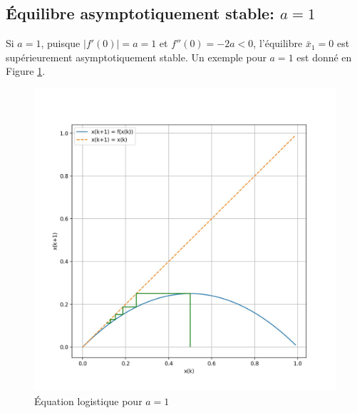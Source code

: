         \subsection{Équilibre asymptotiquement stable: $a = 1$}
            Si $a = 1$, puisque $|f'(0)| = a = 1$ et $f''(0) = -2a < 0$, l'équilibre $\bar{x}_1 = 0$ est supérieurement asymptotiquement stable. Un exemple pour $a=1$ est donné en Figure \ref{fig:logistique_differences_2}.
            \begin{figure}[ht!]
                \centering
                \includegraphics[width=\textwidth]{images/logistique_differences_2.jpg}
                \caption{Équation logistique pour $a=1$}
                \label{fig:logistique_differences_2}
            \end{figure}

